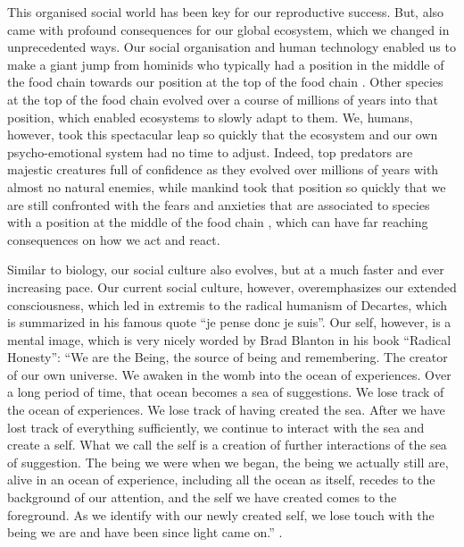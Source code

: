 \documentclass[
  11pt,
]{book}
\begin{document}
This organised social world has been key for our reproductive success. But, also came with profound consequences for our global ecosystem, which we changed in unprecedented ways. Our social organisation and human technology enabled us to make a giant jump from hominids who typically had a position in the middle of the food chain towards our position at the top of the food chain \citep{Harari2015}. Other species at the top of the food chain evolved over a course of millions of years into that position, which enabled ecosystems to slowly adapt to them. We, humans, however, took this spectacular leap so quickly that the ecosystem and our own psycho-emotional system had no time to adjust. Indeed, top predators are majestic creatures full of confidence as they evolved over millions of years with almost no natural enemies, while mankind took that position so quickly that we are still confronted with the fears and anxieties that are associated to species with a position at the middle of the food chain \citep{Harari2015}, which can have far reaching consequences on how we act and react.

Similar to biology, our social culture also evolves, but at a much faster and ever increasing pace.
Our current social culture, however, overemphasizes our extended consciousness, which led in extremis to the radical humanism of Decartes, which is summarized in his famous quote ``je pense donc je suis''. Our self, however, is a mental image, which is very nicely worded by Brad Blanton in his book ``Radical Honesty'': ``We are the Being, the source of being and remembering. The creator of our own universe. We awaken in the womb into the ocean of experiences. Over a long period of time, that ocean becomes a sea of suggestions. We lose track of the ocean of experiences. We lose track of having created the sea. After we have lost track of everything sufficiently, we continue to interact with the sea and create a self. What we call the self is a creation of further interactions of the sea of suggestion. The being we were when we began, the being we actually still are, alive in an ocean of experience, including all the ocean as itself, recedes to the background of our attention, and the self we have created comes to the foreground. As we identify with our newly created self, we lose touch with the being we are and have been since light came on.'' \citep{Blanton1996}.
\end{document}
